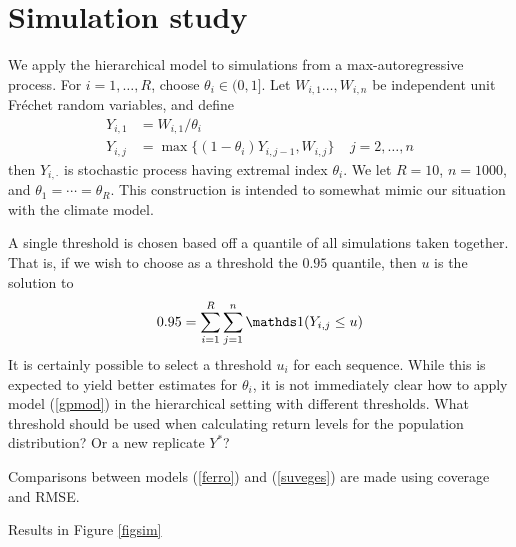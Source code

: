 \section{Simulation study}
\label{sim}

We apply the hierarchical model to simulations from a max-autoregressive process. For $i=1,\ldots,R$, choose $\theta_i\in(0,1]$. Let $W_{i,1}\ldots,W_{i,n}$ be independent unit Fr{\'e}chet random variables, and define
\begin{align}
Y_{i,1} &= W_{i,1}/\theta_i \nonumber \\
Y_{i,j} &= \max\{(1-\theta_i)Y_{i,j-1}, W_{i,j}\}~~~~~j=2,\ldots,n \label{max}
\end{align}
then $Y_{i,\cdot}$ is stochastic process having extremal index $\theta_i$. We let $R=10$, $n=1000$, and $\theta_1=\cdots=\theta_R$. This construction is intended to somewhat mimic our situation with the climate model.

A single threshold is chosen based off a quantile of all simulations taken together. That is, if we wish to choose as a threshold the $0.95$ quantile, then $u$ is the solution to
\[ 0.95 = \sum_{i=1}^R\sum_{j=1}^n\ind(Y_{i,j} \leq u) \]
It is certainly possible to select a threshold $u_i$ for each sequence. While this is expected to yield better estimates for $\theta_i$, it is not immediately clear how to apply model (\ref{gpmod}) in the hierarchical setting with different thresholds. What threshold should be used when calculating return levels for the population distribution? Or a new replicate $Y^*$?

Comparisons between models (\ref{ferro}) and (\ref{suveges}) are made using coverage and RMSE.

Results in Figure \ref{figsim}


